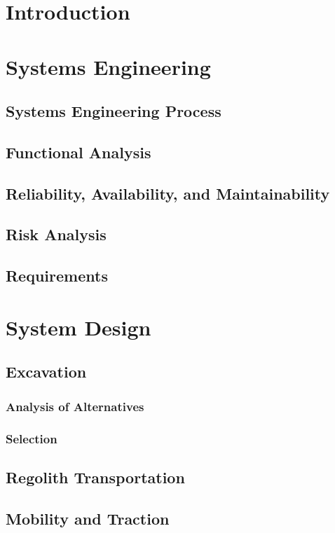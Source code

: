 \documentclass[12pt]{article}
\begin{document}
\chapter{Introduction}

\chapter{Systems Engineering}
\section{Systems Engineering Process}
\section{Functional Analysis}
\section{Reliability, Availability, and Maintainability}
\section{Risk Analysis}
\section{Requirements}


\chapter{System Design}

\section{Excavation}
\subsection{Analysis of Alternatives}
\subsection{Selection}

\section{Regolith Transportation}
\section{Mobility and Traction}
\end{document}
